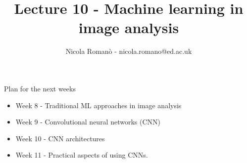 \documentclass[9pt, aspectratio=169]{beamer}
\author{Nicola Roman\`o - nicola.romano@ed.ac.uk}
\title{Lecture 10 - Machine learning in image analysis}
\date{}
\begin{document}

\begin{frame}
    \titlepage
\end{frame}

\begin{frame}
    {Plan for the next weeks}
    \begin{itemize}
        \item Week 8 - Traditional ML approaches in image analysis
        \item Week 9 - Convolutional neural networks (CNN)
        \item Week 10 - CNN architectures
        \item Week 11 - Practical aspects of using CNNs.
    \end{itemize}
\end{frame}
\end{document}
